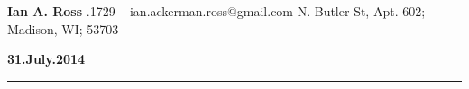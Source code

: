 \documentclass[11pt]{letter} %
\def\today{
  \textcolor[rgb]{0.188,0.337,0.549}{\large{\bf 31.July.2014}}
  \hrule
}
\begin{document}

\begin{letter}{}


\begin{center}
    {\Large\bf Ian A. Ross} %
    \smallskip{}.1729 -- ian.ackerman.ross@gmail.com
    \smallskip{} N. Butler St, Apt. 602; Madison, WI; 53703
\end{center} 

\signature{Ian Ross} %


\today
\vspace{5 mm}
 

 

\content





\end{letter}
\end{document}
